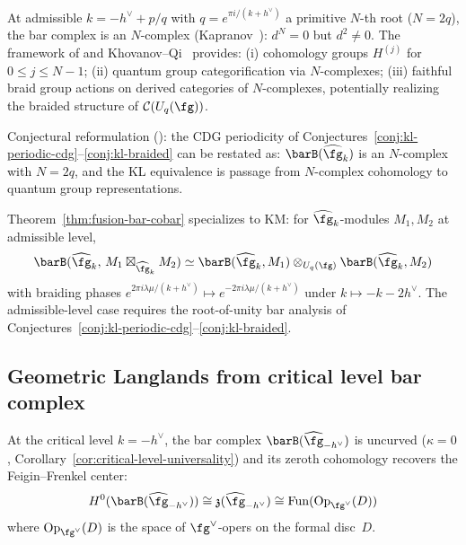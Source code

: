 \begin{remark}\label{rem:n-complex-framework}
At admissible $k = -h^\vee + p/q$ with $q = e^{\pi i/(k+h^\vee)}$ a primitive $N$-th root ($N = 2q$), the bar complex is an $N$-complex (Kapranov~\cite{Kapranov96}): $d^N = 0$ but $d^2 \neq 0$.  The framework of \cite{Kapranov96} and Khovanov--Qi~\cite{KQ20} provides: (i) cohomology groups $H^{(j)}$ for $0 \leq j \leq N-1$; (ii) quantum group categorification via $N$-complexes; (iii) faithful braid group actions on derived categories of $N$-complexes, potentially realizing the braided structure of $\mathcal{C}(U_q(\fg))$.

Conjectural reformulation (\ClaimStatusConjectured): the CDG periodicity of Conjectures~\ref{conj:kl-periodic-cdg}--\ref{conj:kl-braided} can be restated as: $\barB(\widehat{\fg}_k)$ is an $N$-complex with $N = 2q$, and the KL equivalence is passage from $N$-complex cohomology to quantum group representations.
\end{remark}

\begin{remark}
\label{rem:km-fusion-bar-cobar}
Theorem~\ref{thm:fusion-bar-cobar} specializes to KM: for $\widehat{\fg}_k$-modules $M_1, M_2$ at admissible level,
\begin{equation}\label{eq:fusion-bar-cobar}
\barB(\widehat{\fg}_k,\, M_1 \boxtimes_{\widehat{\fg}_k} M_2)
\simeq
\barB(\widehat{\fg}_k, M_1) \otimes_{U_q(\fg)}
\barB(\widehat{\fg}_k, M_2)
\end{equation}
with braiding phases $e^{2\pi i \lambda\mu/(k+h^\vee)} \mapsto e^{-2\pi i \lambda\mu/(k+h^\vee)}$ under $k \mapsto -k - 2h^\vee$.  The admissible-level case requires the root-of-unity bar analysis of Conjectures~\ref{conj:kl-periodic-cdg}--\ref{conj:kl-braided}.
\end{remark}

\subsection{Geometric Langlands from critical level bar complex}
\label{subsec:geom-langlands-bar}

\begin{theorem}\label{thm:oper-bar-h0}
At the critical level $k = -h^\vee$, the bar complex
$\barB(\widehat{\fg}_{-h^\vee})$ is uncurved ($\kappa = 0$,
Corollary~\ref{cor:critical-level-universality}) and its
zeroth cohomology recovers the Feigin--Frenkel center:
\begin{equation}\label{eq:bar-oper}
H^0(\barB(\widehat{\fg}_{-h^\vee}))
\cong \mathfrak{z}(\widehat{\fg}_{-h^\vee})
\cong \mathrm{Fun}(\mathrm{Op}_{\fg^\vee}(D))
\end{equation}
where $\mathrm{Op}_{\fg^\vee}(D)$ is the space of $\fg^\vee$-opers
on the formal disc~$D$.
\end{theorem}


